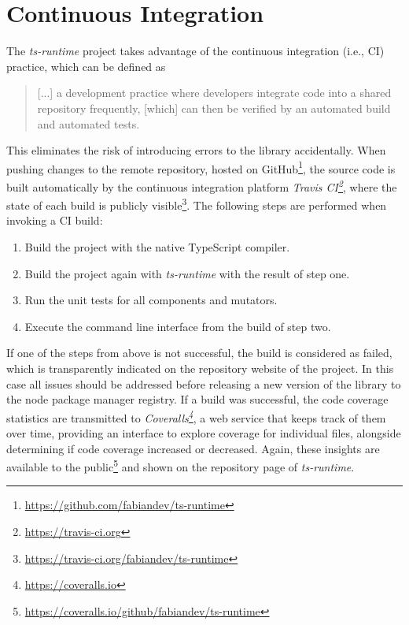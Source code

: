 \section{Continuous Integration}
\label{sec:continuous-integration}

The \emph{ts-runtime} project takes advantage of the continuous integration (i.e., CI) practice, which can be defined as
\begin{quote}
  [...] a development practice where developers integrate code into a shared repository frequently, [which] can then be verified by an automated build and automated tests.~\cite{ContinuousIntegration:Codeship}%
\end{quote}
This eliminates the risk of introducing errors to the library accidentally. When pushing changes to the remote repository, hosted on GitHub\footnote{\url{https://github.com/fabiandev/ts-runtime}}, the source code is built automatically by the continuous integration platform \emph{Travis CI\footnote{\url{https://travis-ci.org}}}, where the state of each build is publicly visible\footnote{\url{https://travis-ci.org/fabiandev/ts-runtime}}. The following steps are performed when invoking a CI build:
\begin{enumerate}
  \item Build the project with the native TypeScript compiler.
  \item Build the project again with \emph{ts-runtime} with the result of step one.
  \item Run the unit tests for all components and mutators.
  \item Execute the command line interface from the build of step two.
\end{enumerate}
If one of the steps from above is not successful, the build is considered as failed, which is transparently indicated on the repository website of the project. In this case all issues should be addressed before releasing a new version of the library to the node package manager registry. If a build was successful, the code coverage statistics are transmitted to \emph{Coveralls\footnote{\url{https://coveralls.io}}}, a web service that keeps track of them over time, providing an interface to explore coverage for individual files, alongside determining if code coverage increased or decreased. Again, these insights are available to the public\footnote{\url{https://coveralls.io/github/fabiandev/ts-runtime}} and shown on the repository page of \emph{ts-runtime}.

